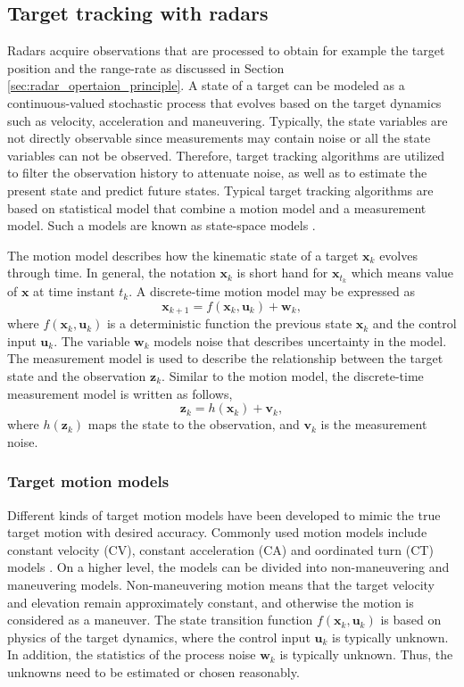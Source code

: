 \documentclass[english, 12pt, a4paper, elec, utf8, a-1b, online]{aaltothesis}
\renewcommand{\vec}[1]{\mathbf{#1}}
\newcommand{\x}{\vec{x}_k}
\newcommand{\xnext}{\vec{x}_{k+1}}
\newcommand{\z}{\vec{z}_k}
\newcommand{\cinput}{\vec{u}_k}
\newcommand{\pnoise}{\vec{w}_k}
\newcommand{\onoise}{\vec{v}_k}
\begin{document}
\subsection{Target tracking with radars} \label{sec:Tracking}

Radars acquire observations that are processed to obtain for example the target position and the range-rate as discussed in Section \ref{sec:radar_opertaion_principle}.
A state of a target can be modeled as a continuous-valued stochastic process that evolves based on the target dynamics such as velocity, acceleration and maneuvering. 
Typically, the state variables are not directly observable since measurements may contain noise or all the state variables can not be observed.
Therefore, target tracking algorithms are utilized to filter the observation history to attenuate noise, as well as to estimate the present state and predict future states.
Typical target tracking algorithms are based on statistical model that combine a motion model and a measurement model. 
Such a models are known as state-space models \cite{RongLi2003}.

The motion model describes how the kinematic state of a target $\x$ evolves through time.
In general, the notation $\x$ is short hand for $\vec{x}_{t_k}$ which means value of $\vec{x}$ at time instant $t_k$. 
A discrete-time motion model may be expressed as
\begin{equation}\label{eq:spm_motion}
    \xnext  = f(\x, \cinput) + \pnoise,
\end{equation}
where $f(\x, \cinput)$ is a deterministic function the previous state $\x$ and the control input $\cinput$. 
The variable $\pnoise$ models noise that describes uncertainty in the model.
The measurement model is used to describe the relationship between the target state and the observation $\z$. 
Similar to the motion model, the discrete-time measurement model is written as follows,
\begin{equation}\label{eq:spm_obs}
    \z = h(\x) + \onoise,
\end{equation}
where $h(\z)$ maps the state to the observation, and $\onoise$ is the measurement noise.

\subsubsection{Target motion models} \label{sec:target_models}

Different kinds of target motion models have been developed to mimic the true target motion with desired accuracy. 
Commonly used motion models include constant velocity (CV), constant acceleration (CA) and oordinated turn (CT) models \cite{RongLi2003}.
On a higher level, the models can be divided into non-maneuvering and maneuvering models. 
Non-maneuvering motion means that the target velocity and elevation remain approximately constant, and otherwise the motion is considered as a maneuver.
The state transition function $f(\x, \cinput)$ is based on physics of the target dynamics, where the control input $\cinput$ is typically unknown.
In addition, the statistics of the process noise $\pnoise$ is typically unknown.
Thus, the unknowns need to be estimated or chosen reasonably.  
\end{document}
